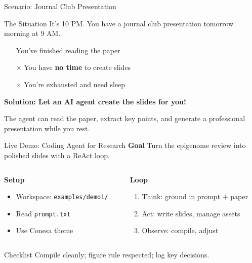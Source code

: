 \documentclass[aspectratio=169]{beamer}
\begin{document}
\begin{frame}{Scenario: Journal Club Presentation}
  \begin{block}{The Situation}
    It's 10 PM. You have a journal club presentation tomorrow morning at 9 AM.
  \end{block}

  \vspace{0.3cm}
  \begin{itemize}
    \item[\checkmark] You've finished reading the paper
    \item[$\times$] You have \textbf{no time} to create slides
    \item[$\times$] You're exhausted and need sleep
  \end{itemize}

  \vspace{0.5cm}
  \begin{center}
    \textcolor{conesaTeal}{\textbf{Solution: Let an AI agent create the slides for you!}}
  \end{center}

  \vspace{0.3cm}
  \small
  The agent can read the paper, extract key points, and generate a professional presentation while you rest.
\end{frame}

\begin{frame}{Live Demo: Coding Agent for Research}
  \textbf{Goal}\; Turn the epigenome review into polished slides with a ReAct loop.

  \vspace{0.5cm}
  \begin{columns}[T]
    \begin{column}{0.52\textwidth}
      \textbf{Setup}
      \begin{itemize}
        \item Workspace: \texttt{examples/demo1/}
        \item Read \texttt{prompt.txt}
        \item Use Conesa theme
      \end{itemize}
    \end{column}
    \begin{column}{0.44\textwidth}
      \textbf{Loop}
      \begin{enumerate}
        \item Think: ground in prompt + paper
        \item Act: write slides, manage assets
        \item Observe: compile, adjust
      \end{enumerate}
    \end{column}
  \end{columns}

  \begin{alertblock}{Checklist}
    Compile cleanly; figure rule respected; log key decisions.
  \end{alertblock}
\end{frame}
\end{document}
